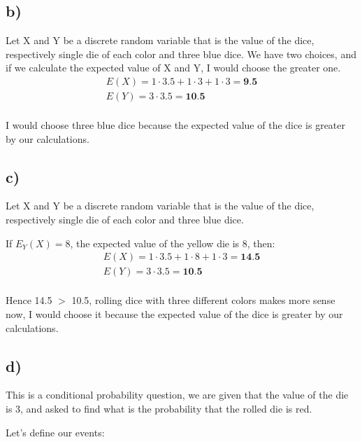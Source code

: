 \documentclass[12pt]{article}
\begin{document}
\subsection*{b)} 
Let X and Y be a discrete random variable that is the value of the dice, respectively single die of each color and three blue dice. We have two choices, and if we calculate the expected value of X and Y, I would choose the greater one. 
\begin{equation*}
    \begin{aligned}
        E(X) = 1 \cdot 3.5 + 1 \cdot  3 + 1 \cdot 3 = \textbf{9.5} \\
        E(Y) = 3 \cdot 3.5 = \textbf{10.5} \\
    \end{aligned}
\end{equation*}


I would choose three blue dice because the expected value of the dice is greater by our calculations.

\subsection*{c)} 
Let X and Y be a discrete random variable that is the value of the dice, respectively single die of each color and three blue dice.

If $E_Y(X) = 8$, the expected value of the yellow die is 8, then:
\begin{equation*}
    \begin{aligned}
        E(X) = 1 \cdot 3.5 + 1 \cdot  8 + 1 \cdot 3 = \textbf{14.5} \\
        E(Y) = 3 \cdot 3.5 = \textbf{10.5} \\
    \end{aligned}
\end{equation*}

Hence 14.5 $>$ 10.5, rolling dice with three different colors makes more sense now, I would choose it because the expected value of the dice is greater by our calculations. 

\subsection*{d)} 
This is a conditional probability question, we are given that the value of the die is 3, and asked to find what is the probability that the rolled die is red.

Let's define our events: \\ 
\end{document}
